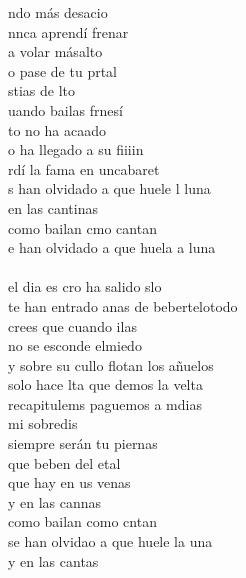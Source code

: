 \begin{cancion}[Sirenas][Taburete]%
	ndo más desacio\\
	nnca aprendí  frenar\\
	 a volar másalto\\
	o pase de tu prtal\\
	stias de lto\\
	uando bailas frnesí\\
	to no ha acaado\\
	o ha llegado a su fiiiin\\
	rdí la fama en uncabaret\\
	s han olvidado a que huele l luna\\
	en las cantinas \\
	como bailan cmo cantan\\
	e han olvidado a que huela a luna\\
\jump\\
	el dia es cro ha salido slo\\
	te han entrado anas de bebertelotodo\\
	crees que cuando ilas \\
	no se esconde elmiedo\\
	y sobre su cullo flotan los añuelos\\
	solo hace lta que demos la velta\\
	recapitulems paguemos a mdias\\
	mi sobredis \\
	siempre serán tu piernas\\
	que beben del etal \\
	que hay en us venas\\
	y en las cannas \\
	como bailan como cntan\\
	se han olvidao a que huele la una\\
	y en las cantas \\

\end{cancion}
